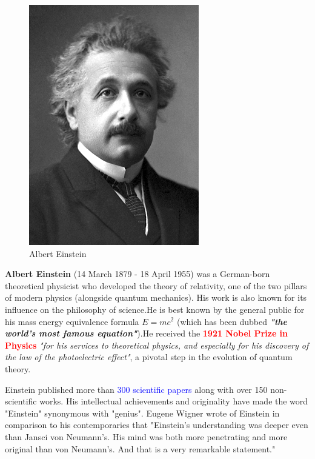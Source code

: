 \documentclass{article}
\begin{document}
\begin{figure}
\vspace{-10pt}

\begin{center}
\includegraphics[width=.5\textwidth]{figures/Albert_Einstein__Nobel_.png}
\end{center}

\vspace{-10pt}
\caption{Albert Einstein}
\vspace{-10pt}
\end{figure}

\textbf{Albert Einstein} (14 March 1879 {-} 18 April 1955) was a German-born theoretical physicist who developed the theory of relativity, one of the two pillars of modern physics (alongside quantum mechanics). His work is also known for its influence on the philosophy of science.He is best known by the general public for his mass energy equivalence formula \textbf{$ E = mc^2 $} (which has been dubbed \textbf{\textit{"the world's most famous equation"}}).He received the \textcolor{red}{\textbf{1921 Nobel Prize in Physics}} \textit{"for his services to theoretical physics, and especially for his discovery of the law of the photoelectric effect"}, a pivotal step in the evolution of quantum theory.


Einstein published more than \textcolor{blue}{300 scientific papers} along with over 150 non-scientific works. His intellectual achievements and originality have made the word "Einstein" synonymous with "genius". Eugene Wigner wrote of Einstein in comparison to his contemporaries that "Einstein's understanding was deeper even than Jansci von Neumann's. His mind was both more penetrating and more original than von Neumann's. And that is a very remarkable statement."
\end{document}
